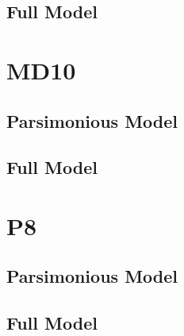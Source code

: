 \documentclass[12pt]{amsart}
\begin{document}
\subsection{Full Model}

\section{MD10}
\subsection{Parsimonious Model}

\subsection{Full Model}

\section{P8}
\subsection{Parsimonious Model}

\subsection{Full Model}
\end{document}
